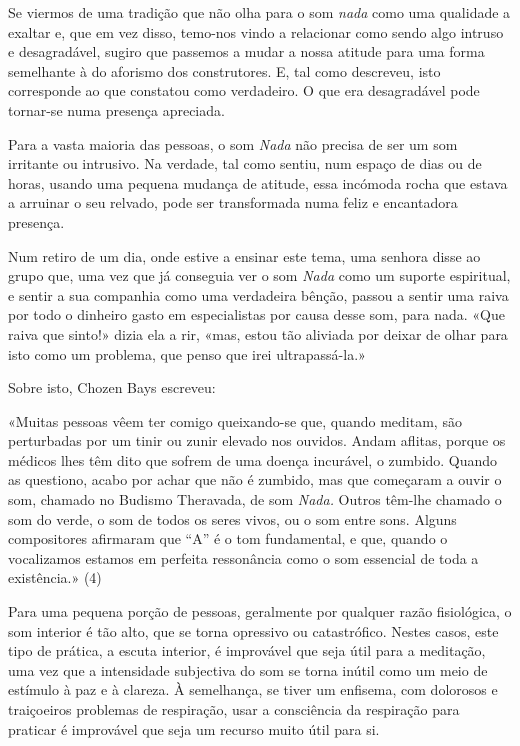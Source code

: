 Se viermos de uma tradição que não olha para o som \emph{nada} como uma
qualidade a exaltar e, que em vez disso, temo-nos vindo a relacionar
como sendo algo intruso e desagradável, sugiro que passemos a mudar a
nossa atitude para uma forma semelhante à do aforismo dos construtores.
E, tal como descreveu, isto corresponde ao que constatou como
verdadeiro. O que era desagradável pode tornar-se numa presença
apreciada.

Para a vasta maioria das pessoas, o som \emph{Nada} não precisa de ser
um som irritante ou intrusivo. Na verdade, tal como sentiu, num espaço
de dias ou de horas, usando uma pequena mudança de atitude, essa
incómoda rocha que estava a arruinar o seu relvado, pode ser
transformada numa feliz e encantadora presença.

Num retiro de um dia, onde estive a ensinar este tema, uma senhora disse
ao grupo que, uma vez que já conseguia ver o som \emph{Nada} como um
suporte espiritual, e sentir a sua companhia como uma verdadeira bênção,
passou a sentir uma raiva por todo o dinheiro gasto em especialistas por
causa desse som, para nada. «Que raiva que sinto!» dizia ela a rir,
«mas, estou tão aliviada por deixar de olhar para isto como um problema,
que penso que irei ultrapassá-la.»

Sobre isto, Chozen Bays escreveu:

«Muitas pessoas vêem ter comigo queixando-se que, quando meditam, são
perturbadas por um tinir ou zunir elevado nos ouvidos. Andam aflitas,
porque os médicos lhes têm dito que sofrem de uma doença incurável, o
zumbido. Quando as questiono, acabo por achar que não é zumbido, mas que
começaram a ouvir o som, chamado no Budismo Theravada, de som
\emph{Nada.} Outros têm-lhe chamado o som do verde, o som de todos os
seres vivos, ou o som entre sons. Alguns compositores afirmaram que
``A'' é o tom fundamental, e que, quando o vocalizamos estamos em
perfeita ressonância como o som essencial de toda a existência.» (4)

Para uma pequena porção de pessoas, geralmente por qualquer razão
fisiológica, o som interior é tão alto, que se torna opressivo ou
catastrófico. Nestes casos, este tipo de prática, a escuta interior, é
improvável que seja útil para a meditação, uma vez que a intensidade
subjectiva do som se torna inútil como um meio de estímulo à paz e à
clareza. À semelhança, se tiver um enfisema, com dolorosos e traiçoeiros
problemas de respiração, usar a consciência da respiração para praticar
é improvável que seja um recurso muito útil para si.

